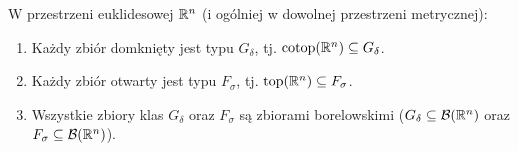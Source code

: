 \begin{wn} W przestrzeni euklidesowej $\mathbb{R}^{n}$ (i ogólniej w dowolnej przestrzeni metrycznej):
    \begin{enumerate}
        \item Każdy zbiór domknięty jest typu $G_\delta$, tj. $\mathrm{cotop}(\mathbb{R}^{n}) \subseteq  G_\delta$.
        \item Każdy zbiór otwarty jest typu $F_\sigma$, tj. $\mathrm{top}(\mathbb{R}^{n}) \subseteq  F_\sigma$.
        \item Wszystkie zbiory klas $G_\delta$ oraz $F_\sigma$ są zbiorami borelowskimi ($G_\delta \subseteq  \mathcal{B}({\mathbb{R}^{n}})$ oraz $F_\sigma \subseteq  \mathcal{B}({\mathbb{R}^{n}})$).
    \end{enumerate}
\end{wn}
